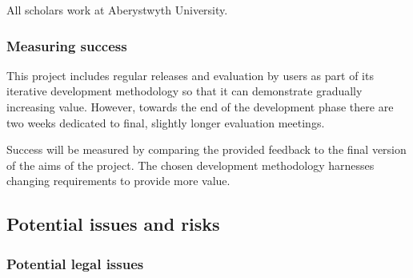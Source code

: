 \documentclass[11pt,fleqn,twoside]{article}
\begin{document}
All scholars work at Aberystwyth University.

\subsubsection{Measuring success}
This project includes regular releases and evaluation by users as part of its iterative development methodology so that it can demonstrate gradually increasing value. However, towards the end of the development phase there are two weeks dedicated to final, slightly longer evaluation meetings.

Success will be measured by comparing the provided feedback to the final version of the aims of the project. The chosen development methodology harnesses changing requirements to provide more value.

\subsection{Potential issues and risks}
\subsubsection{Potential legal issues}
%
%
%
%
\end{document}
